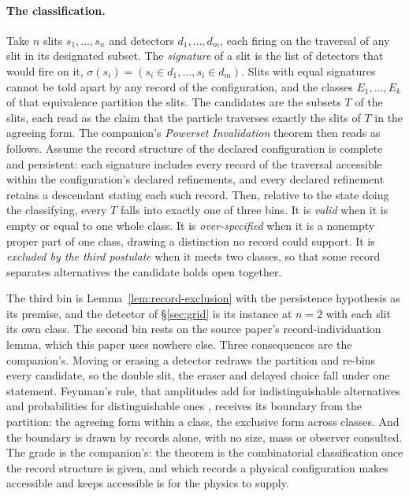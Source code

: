 \paragraph{The classification.} Take $n$ slits $s_1, \dots, s_n$ and detectors $d_1, \dots, d_m$, each firing on the traversal of any slit in its designated subset. The \emph{signature} of a slit is the list of detectors that would fire on it, $\sigma(s_i) = (s_i \in d_1, \dots, s_i \in d_m)$. Slits with equal signatures cannot be told apart by any record of the configuration, and the classes $E_1, \dots, E_k$ of that equivalence partition the slits. The candidates are the subsets $T$ of the slits, each read as the claim that the particle traverses exactly the slits of $T$ in the agreeing form. The companion's \emph{Powerset Invalidation} theorem then reads as follows. Assume the record structure of the declared configuration is complete and persistent: each signature includes every record of the traversal accessible within the configuration's declared refinements, and every declared refinement retains a descendant stating each such record. Then, relative to the state doing the classifying, every $T$ falls into exactly one of three bins. It is \emph{valid} when it is empty or equal to one whole class. It is \emph{over-specified} when it is a nonempty proper part of one class, drawing a distinction no record could support. It is \emph{excluded by the third postulate} when it meets two classes, so that some record separates alternatives the candidate holds open together.

The third bin is Lemma~\ref{lem:record-exclusion} with the persistence hypothesis as its premise, and the detector of \S\ref{sec:grid} is its instance at $n = 2$ with each slit its own class. The second bin rests on the source paper's record-individuation lemma, which this paper uses nowhere else. Three consequences are the companion's. Moving or erasing a detector redraws the partition and re-bins every candidate, so the double slit, the eraser and delayed choice fall under one statement. Feynman's rule, that amplitudes add for indistinguishable alternatives and probabilities for distinguishable ones \cite{feynman1965lectures}, receives its boundary from the partition: the agreeing form within a class, the exclusive form across classes. And the boundary is drawn by records alone, with no size, mass or observer consulted. The grade is the companion's: the theorem is the combinatorial classification once the record structure is given, and which records a physical configuration makes accessible and keeps accessible is for the physics to supply.

